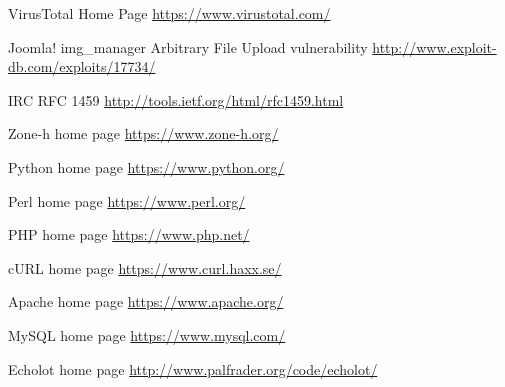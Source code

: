 \begin{thebibliography}{99}
VirusTotal Home Page
\url{https://www.virustotal.com/}

Joomla! img\_manager Arbitrary File Upload vulnerability
\url{http://www.exploit-db.com/exploits/17734/}

IRC RFC 1459
\url{http://tools.ietf.org/html/rfc1459.html}

Zone-h home page
\url{https://www.zone-h.org/}

Python home page
\url{https://www.python.org/}

Perl home page
\url{https://www.perl.org/}

PHP home page
\url{https://www.php.net/}

cURL home page
\url{https://www.curl.haxx.se/}

Apache home page
\url{https://www.apache.org/}

MySQL home page
\url{https://www.mysql.com/}

Echolot home page
\url{http://www.palfrader.org/code/echolot/}

\end{thebibliography}
